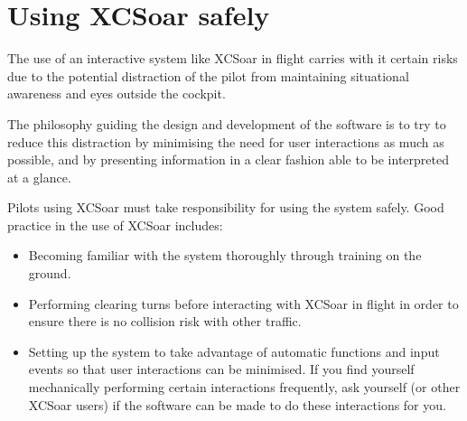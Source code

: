 \section{Using XCSoar safely}\label{sec:usingxcsoarsafely}\label{conf:usingxcsoarsafely}
The use of an interactive system like XCSoar in flight carries with it
certain risks due to the potential distraction of the pilot from
maintaining situational awareness and eyes outside the cockpit.

The philosophy guiding the design and development of the software is
to try to reduce this distraction by minimising the need for user
interactions as much as possible, and by presenting information in a
clear fashion able to be interpreted at a glance.

Pilots using XCSoar must take responsibility for using the system safely.
Good practice in the use of XCSoar includes:
\begin{itemize}
\item Becoming familiar with the system thoroughly through training on 
  the ground.
\item Performing clearing turns before interacting with XCSoar in flight
  in order to ensure there is no collision risk with other traffic.
\item Setting up the system to take advantage of automatic functions
  and input events so that user interactions can be minimised.  If you
  find yourself mechanically performing certain interactions frequently,
  ask yourself (or other XCSoar users) if the software can be made to do 
  these interactions for you.
\end{itemize}
